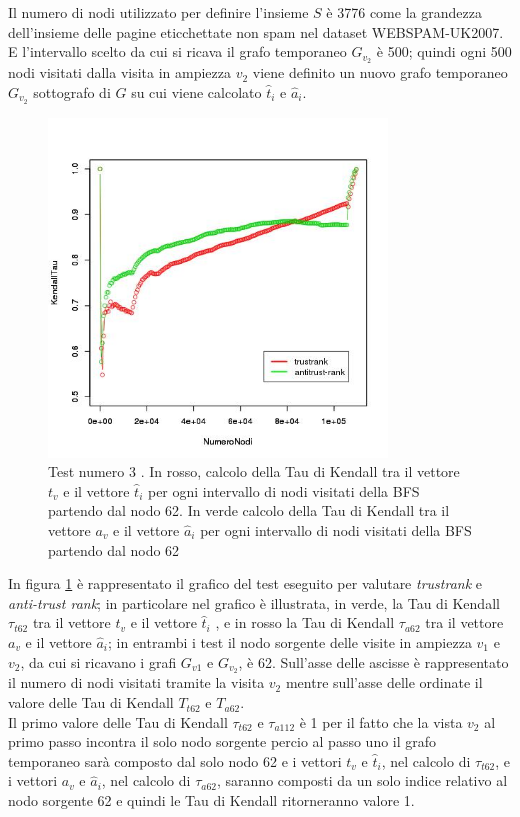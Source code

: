 Il numero di  nodi utilizzato per definire l'insieme \(S\) è 3776 come la grandezza dell'insieme delle pagine eticchettate non spam nel dataset WEBSPAM-UK2007. E l'intervallo scelto da cui si ricava il grafo temporaneo \(G_{v_2}\) è 500; quindi ogni 500 nodi visitati dalla visita in ampiezza \(v_2\) viene definito un nuovo grafo temporaneo \(G_{v_2}\) sottografo di \(G\) su cui viene calcolato \(\hat{t}_i\) e \(\hat{a}_i\).
\begin{figure}
\centering
 \includegraphics[height=9cm]{immagini/test3/coplotTrustAnti_Mode1_set3776_62}
 \caption{Test numero 3 . In rosso, calcolo della Tau di Kendall  tra il vettore $t_v$ e il vettore $\hat{t}_i$ per ogni intervallo di nodi visitati della BFS partendo dal nodo 62. In verde calcolo della Tau di Kendall tra il vettore $a_v$ e il vettore $\hat{a}_i$ per ogni intervallo di nodi visitati della BFS partendo dal nodo 62}
 \label{fig:test3coplotTrustAntiModeB62}
\end{figure}

In figura \ref{fig:test3coplotTrustAntiModeB62} è rappresentato il grafico del test eseguito per valutare \textit{trustrank} e \textit{anti-trust rank}; in particolare nel grafico è illustrata, in verde, la Tau di Kendall \(\tau_{t62}\) tra il vettore \(t_v\) e il vettore \(\hat{t}_i\) , e in rosso la Tau di Kendall \(\tau_{a62}\) tra il vettore \(a_v\) e il vettore \(\hat{a}_i\); in entrambi i test il nodo sorgente delle visite in ampiezza \(v_1\) e \(v_2\), da cui si ricavano i grafi \(G_{v1}\) e \(G_{v_2}\), è 62. Sull'asse delle ascisse è rappresentato il numero di nodi visitati tramite la visita \(v_2\) mentre sull'asse delle ordinate il valore delle Tau di Kendall \(T_{t62}\) e \(T_{a62}\).\\
Il primo valore delle Tau di Kendall \(\tau_{t62}\) e \(\tau_{a112}\) è 1 per il fatto che la vista \(v_2\) al primo passo  incontra il solo nodo sorgente percio al passo uno il grafo temporaneo sarà composto dal solo nodo 62 e i vettori \(t_v\) e \(\hat{t}_i\), nel calcolo di \(\tau_{t62}\), e i vettori \(a_v\) e \(\hat{a}_i\), nel calcolo di \(\tau_{a62}\), saranno composti da un solo indice relativo al nodo sorgente 62 e quindi le Tau di Kendall ritorneranno valore 1.

